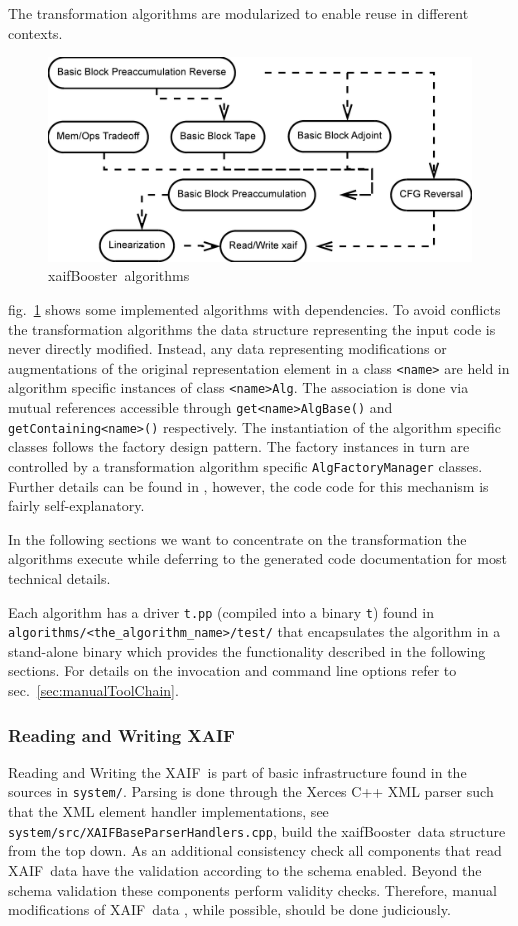 \documentclass{book}
\newcommand{\xaif}{XAIF}
\newcommand{\xaifBooster}{xaifBooster}
\newcommand{\refsec}[1]{{sec.~\ref{#1}}}
\newcommand{\reffig}[1]{{fig.~\ref{#1}}}
\begin{document}
The transformation algorithms are modularized to enable reuse in different 
contexts. 
\begin{figure}
  \centering \includegraphics[width=.45\textwidth]{allAlgs}
  \caption{\xaifBooster\ algorithms} \label{fig:allAlgs}
\end{figure}
\reffig{fig:allAlgs} shows some implemented algorithms with dependencies.
To avoid conflicts the transformation algorithms the data structure representing the input code  
is never directly modified. 
Instead, any data representing modifications or augmentations of the 
original representation element in a class \lstinline{<name>}
are held in algorithm specific instances of class \lstinline{<name>Alg}.
The association is done via mutual references accessible 
through \lstinline{get<name>AlgBase()} and \lstinline{getContaining<name>()} respectively.
The instantiation of the algorithm specific classes follows 
the factory design pattern. The factory instances in turn are controlled 
by a transformation algorithm specific \lstinline{AlgFactoryManager} classes. 
Further details can be found in \cite{Utke2003STI}, however, the code 
code for this mechanism is fairly self-explanatory.  

In the following sections we want to concentrate on the transformation 
the algorithms execute while deferring to the generated code 
documentation for most technical details.

Each algorithm has a driver \lstinline{t.pp} (compiled into a binary \lstinline{t}) 
found in \lstinline{algorithms/<the_algorithm_name>/test/} 
that encapsulates the algorithm 
in a stand-alone binary which provides the functionality described 
in the following 
sections. For details on the invocation and command line options refer to 
\refsec{sec:manualToolChain}.

\subsubsection{Reading and Writing \xaif}\label{sec:readWriteXaif}
Reading and Writing the \xaif\ is part of basic infrastructure
found in the sources in \lstinline{system/}.
Parsing is done through the Xerces C++ XML parser \cite{xercesWeb}
such that the XML element handler implementations, see \lstinline{system/src/XAIFBaseParserHandlers.cpp},
build the \xaifBooster\ data 
structure from the top down. 
As an additional consistency check all components that read \xaif\ data 
have the validation according to the schema enabled. Beyond the schema 
validation these components perform validity checks. Therefore, 
manual modifications of \xaif\ data , while possible, should 
be done judiciously. 
\end{document}
